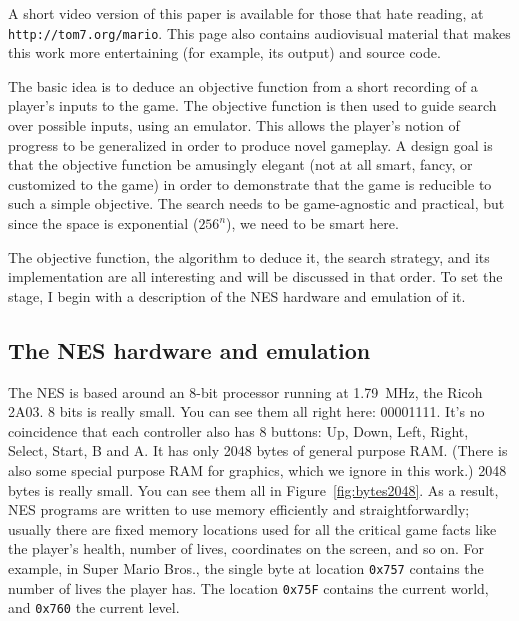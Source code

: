 \documentclass[twocolumn]{article}
\begin{document}
A short video version of this paper is available for those that hate reading, at \verb+http://tom7.org/mario+. This page also contains audiovisual material that makes this work more entertaining (for example, its output) and source code.

The basic idea is to deduce an objective function from a short recording of a player's inputs to the game. The objective function is then used to guide search over possible inputs, using an emulator. This allows the player's notion of progress to be generalized in order to produce novel gameplay. A design goal is that the objective function be amusingly elegant (not at all smart, fancy, or customized to the game) in order to demonstrate that the game is reducible to such a simple objective. The search needs to be game-agnostic and practical, but since the space is exponential ($256^{n}$), we need to be smart here.

The objective function, the algorithm to deduce it, the search strategy, and its implementation are all interesting and will be discussed in that order. To set the stage, I begin with a description of the NES hardware and emulation of it.

\subsection{The NES hardware and emulation}
The NES is based around an 8-bit processor running at 1.79~MHz, the Ricoh 2A03. 8 bits is really small. You can see them all right here: 00001111. It's no coincidence that each controller also has 8 buttons: Up, Down, Left, Right, Select, Start, B and A. It has only 2048 bytes of general purpose RAM. (There is also some special purpose RAM for graphics, which we ignore in this work.) 2048 bytes is really small. You can see them all in Figure~\ref{fig:bytes2048}. As a result, NES programs are written to use memory efficiently and straightforwardly; usually there are fixed memory locations used for all the critical game facts like the player's health, number of lives, coordinates on the screen, and so on. For example, in Super Mario Bros., the single byte at location \verb+0x757+ contains the number of lives the player has. The location \verb+0x75F+ contains the current world, and \verb+0x760+ the current level.

\end{document}
